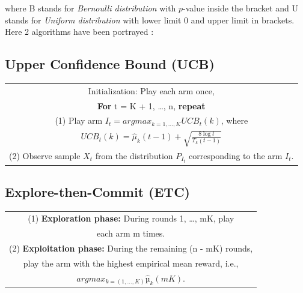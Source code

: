 \documentclass[12pt]{report}
\begin{document}
\noindent where B stands for \textit{Bernoulli distribution} with $p$-value inside the bracket and U stands for \textit{Uniform distribution} with lower limit 0 and upper limit in brackets.\\

\noindent Here 2 algorithms have been portrayed :

	\subsection{Upper Confidence Bound (UCB)} 
		\begin{table}[H]
  			\centering
  			\begin{tabular}{ | c |}
    		\hline
    		\noindent Initialization: Play each arm once,\\
    		\noindent \textbf{For} t = K + 1, \dots , n, \textbf{repeat}\\
    		(1) Play arm $I_t = arg max_{k=1,...,K} UCB_t(k)$, where \\
    		$UCB_t(k) = \hat{\mu}_k(t-1) + \sqrt{\frac{8 \log t}{T_k (t-1)}}$\\
    		(2) Observe sample $X_t$ from the distribution $P_{I_{t}}$ corresponding to the arm $I_t$.\\
    		\hline
			\end{tabular}
		\end{table}
		
	\subsection{Explore-then-Commit (ETC)}
		\begin{table}[H]
  			\centering
  			\begin{tabular}{ | c |}
    		\hline
    		(1)  \textbf{Exploration phase:} During rounds 1, \dots , mK, play \\
    		each arm m times.\\
    		(2) \textbf{Exploitation phase:} During the remaining (n - mK) rounds, \\
    		play the arm with the highest empirical mean reward, i.e.,\\
    		 $arg max_{k=(1,\dots,K)} \hat{µ}_k(mK)$.\\
    		\hline
			\end{tabular}
		\end{table}
\end{document}
